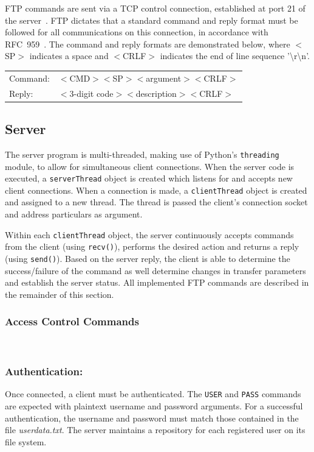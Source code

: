 \documentclass[10pt,twocolumn]{witseiepaper}
\begin{document}
FTP commands are sent via a TCP control connection, established at port 21 of the server~\cite{topDownApproach6th}. FTP dictates that a standard command and reply format must be followed for all communications on this connection, in accordance with RFC~959~\cite{rfc959}. The command and reply formats are demonstrated below, where $<$SP$>$ indicates a space and $<$CRLF$>$ indicates the end of line sequence '\textbackslash r\textbackslash n'.

\begin{tabular}{ll}
Command:& $<$CMD$>$$<$SP$>$$<$argument$>$$<$CRLF$>$ \\[5pt]
Reply:& $<$3-digit code$>$$<$description$>$$<$CRLF$>$ \\[5pt]
\end{tabular} 

\vspace*{-2mm}
\subsection{Server}

 The server program is multi-threaded, making use of Python's \texttt{threading} module, to allow for simultaneous client connections. When the server code is executed, a \texttt{serverThread} object is created which listens for and accepts new client connections. When a connection is made, a \texttt{clientThread} object is created and assigned to a new thread. The thread is passed the client's connection socket and address particulars as argument.
 
 Within each \texttt{clientThread} object, the server continuously accepts commands from the client (using \texttt{recv()}), performs the desired action and returns a reply (using \texttt{send()}). Based on the server reply, the client is able to determine the success/failure of the command as well determine changes in transfer parameters and establish the server status. All implemented FTP commands are described in the remainder of this section.
 
\vspace*{-2mm}
\subsubsection{Access Control Commands} $   $

\subsubsection*{Authentication:} \vspace*{-\baselineskip}
Once connected, a client must be authenticated. The \texttt{USER} and \texttt{PASS} commands are expected with plaintext username and password arguments. For a successful authentication, the username and password must match those contained in the file \textit{userdata.txt}. The server maintains a repository for each registered user on its file system. 
\end{document}
